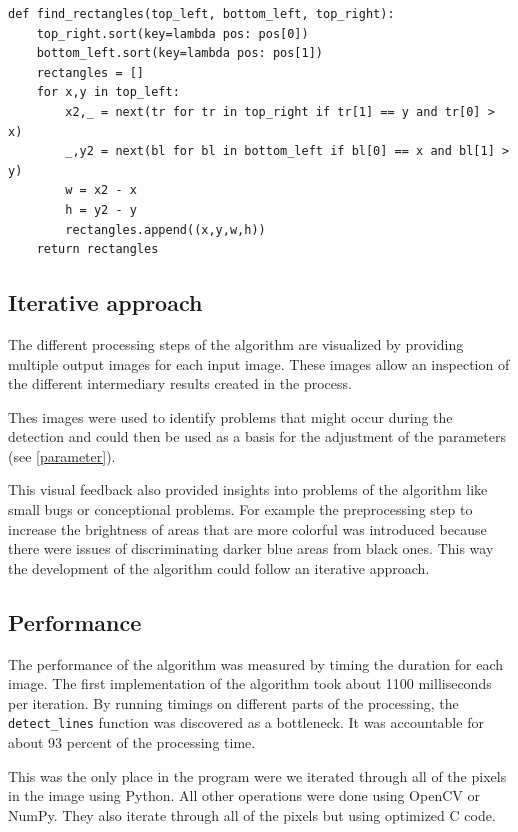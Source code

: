 \documentclass[serif,article,noparskip]{agse-thesis}
\begin{document}
\begin{minipage}{\linewidth}
\begin{lstlisting}[label=lst:findrectangles,caption=Function for constructing rectangles from corners]
def find_rectangles(top_left, bottom_left, top_right):
    top_right.sort(key=lambda pos: pos[0])
    bottom_left.sort(key=lambda pos: pos[1])
    rectangles = []
    for x,y in top_left:
        x2,_ = next(tr for tr in top_right if tr[1] == y and tr[0] > x)
        _,y2 = next(bl for bl in bottom_left if bl[0] == x and bl[1] > y)
        w = x2 - x
        h = y2 - y
        rectangles.append((x,y,w,h))
    return rectangles
\end{lstlisting}
\end{minipage}

\subsection{Iterative approach}

The different processing steps of the algorithm are visualized by providing
multiple output images for each input image. These images allow an inspection
of the different intermediary results created in the process.

Thes images were used to identify problems that might occur during the detection
and could then be used as a basis for the adjustment of the parameters (see
\ref{parameter}).

This visual feedback also provided insights into problems of the algorithm like
small bugs or conceptional problems. For example the preprocessing step to
increase the brightness of areas that are more colorful was introduced because
there were issues of discriminating darker blue areas from black ones. This way
the development of the algorithm could follow an iterative approach.

\subsection{Performance} \label{performance}

The performance of the algorithm was measured by timing the duration for each
image. The first implementation of the algorithm took about 1100 milliseconds per
iteration. By running timings on different parts of the processing, the
\texttt{detect\_lines} function was discovered as a bottleneck. It was
accountable for about 93 percent of the processing time.

This was the only place in the program were we iterated through all of the pixels
in the image using Python. All other operations were done using OpenCV or NumPy.
They also iterate through all of the pixels but using optimized C code.
\end{document}
